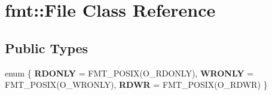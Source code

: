 \hypertarget{classfmt_1_1File}{}\section{fmt\+:\+:File Class Reference}
\label{classfmt_1_1File}
\subsection*{Public Types}
\begin{DoxyCompactItemize}
\item 
enum \{ {\bfseries R\+D\+O\+N\+LY} = F\+M\+T\+\_\+\+P\+O\+S\+IX(O\+\_\+\+R\+D\+O\+N\+LY), 
{\bfseries W\+R\+O\+N\+LY} = F\+M\+T\+\_\+\+P\+O\+S\+IX(O\+\_\+\+W\+R\+O\+N\+LY), 
{\bfseries R\+D\+WR} = F\+M\+T\+\_\+\+P\+O\+S\+IX(O\+\_\+\+R\+D\+WR)
 \}\hypertarget{classfmt_1_1File_acb363a47f227d0b5821b34bb2b302dbd}{}\label{classfmt_1_1File_acb363a47f227d0b5821b34bb2b302dbd}

\end{DoxyCompactItemize}

